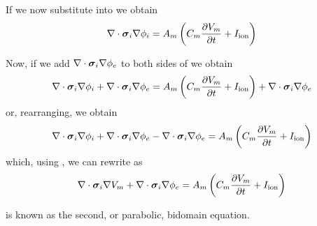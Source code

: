 If we now substitute  into
 we obtain
\begin{equation}
  \divergence{}{\intracellularconductivitytensor\gradient{}{\intracellularpotential}}=
  \membraneareavolumeratio\pbrac{\membranecapacitance\delby{\transmembranevoltage}{t}+\ioniccurrent}
  \label{eqn:IntraCellularCurrentDensityConservationTransmembraneVoltage}
\end{equation}

Now, if we add
$\divergence{}{\intracellularconductivitytensor\gradient{}{\extracellularpotential}}$
to both sides of
we obtain
\begin{equation}
  \divergence{}{\intracellularconductivitytensor\gradient{}{\intracellularpotential}} +
  \divergence{}{\intracellularconductivitytensor\gradient{}{\extracellularpotential}} =
  \membraneareavolumeratio\pbrac{\membranecapacitance\delby{\transmembranevoltage}{t}+\ioniccurrent} +
  \divergence{}{\intracellularconductivitytensor\gradient{}{\extracellularpotential}}  
\end{equation}
or, rearranging, we obtain
\begin{equation}
  \divergence{}{\intracellularconductivitytensor\gradient{}{\intracellularpotential}} +
  \divergence{}{\intracellularconductivitytensor\gradient{}{\extracellularpotential}} -
  \divergence{}{\intracellularconductivitytensor\gradient{}{\extracellularpotential}} =
  \membraneareavolumeratio\pbrac{\membranecapacitance\delby{\transmembranevoltage}{t}+\ioniccurrent} 
\end{equation}
which, using , we can rewrite as
\begin{equation}
  \divergence{}{\intracellularconductivitytensor\gradient{}{\transmembranevoltage}} +
  \divergence{}{\intracellularconductivitytensor\gradient{}{\extracellularpotential}} =
  \membraneareavolumeratio\pbrac{\membranecapacitance\delby{\transmembranevoltage}{t}+\ioniccurrent} 
  \label{eqn:SecondBidomainEquation}
\end{equation}

 is known as the second, or
parabolic, bidomain equation.


